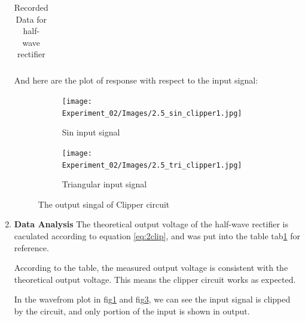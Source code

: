 \begin{enumerate}[I]
\begin{table}[H]
\begin{tabular}{l|cccccccc}
                \end{tabular}
                    \caption{Recorded Data for half-wave rectifier}
                \label{tab:2clip}
            \end{table}
        And here are the plot of response with respect to the input signal:
        \begin{figure}[H]
            \centering
            \begin{subfigure}{0.45\textwidth}
                \texttt{[image: Experiment\_02/Images/2.5\_sin\_clipper1.jpg]}
                \caption{Sin input signal}
                \label{wave:2bSin}
            \end{subfigure}
            \begin{subfigure}{0.45\textwidth}
                \texttt{[image: Experiment\_02/Images/2.5\_tri\_clipper1.jpg]}
                \caption{Triangular input signal}
                \label{wave:2bTri}
            \end{subfigure}
            \caption{The output singal of Clipper circuit}
        \end{figure}
        
        \item \textbf{Data Analysis}\newline
            The theoretical output voltage of the half-wave rectifier is caculated according to equation \ref{eq:2clip}, and was put into the table tab\ref{tab:2clip} for reference.\par

            According to the table, the measured output voltage is consistent with the theoretical output voltage. This means the clipper circuit works as expected.\par

            In the wavefrom plot in fig\ref{wave:2bSin} and fig\ref{wave:2bTri}, we can see the input signal is clipped by the circuit, and only portion of the input is shown in output.\par
    \end{enumerate}

